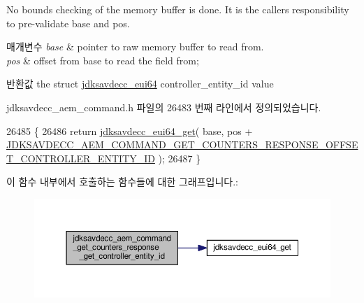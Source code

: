 No bounds checking of the memory buffer is done. It is the caller\textquotesingle{}s responsibility to pre-\/validate base and pos.


\begin{DoxyParams}{매개변수}
{\em base} & pointer to raw memory buffer to read from. \\
\hline
{\em pos} & offset from base to read the field from; \\
\hline
\end{DoxyParams}
\begin{DoxyReturn}{반환값}
the struct \hyperlink{structjdksavdecc__eui64}{jdksavdecc\+\_\+eui64} controller\+\_\+entity\+\_\+id value 
\end{DoxyReturn}


jdksavdecc\+\_\+aem\+\_\+command.\+h 파일의 26483 번째 라인에서 정의되었습니다.


\begin{DoxyCode}
26485 \{
26486     \textcolor{keywordflow}{return} \hyperlink{group__eui64_ga2652311a25a6b91cddbed75c108c7031}{jdksavdecc\_eui64\_get}( base, pos + 
      \hyperlink{group__command__get__counters__response_gab36093ae45b6882f4b873a3584339793}{JDKSAVDECC\_AEM\_COMMAND\_GET\_COUNTERS\_RESPONSE\_OFFSET\_CONTROLLER\_ENTITY\_ID}
       );
26487 \}
\end{DoxyCode}


이 함수 내부에서 호출하는 함수들에 대한 그래프입니다.\+:
\nopagebreak
\begin{figure}[H]
\begin{center}
\leavevmode
\includegraphics[width=350pt]{group__command__get__counters__response_ga586bec25e2630f303a57659979e618a1_cgraph}
\end{center}
\end{figure}


